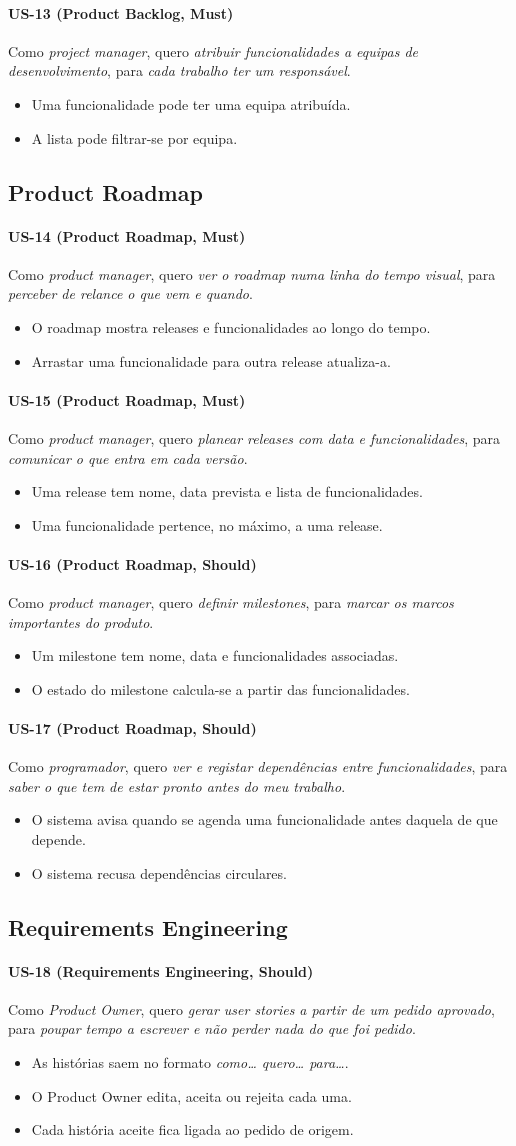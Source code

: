 \documentclass[12pt,a4paper]{article}
\newcommand{\us}[7]{%
  \paragraph{#1 \textnormal{(#2, #6)}}
  Como \textit{#3}, quero \textit{#4}, para \textit{#5}.
  \begin{itemize}
  #7
  \end{itemize}
}
\begin{document}
\us{US-13}{Product Backlog}{project manager}{atribuir funcionalidades a equipas de desenvolvimento}{cada trabalho ter um responsável}{Must}{
\item Uma funcionalidade pode ter uma equipa atribuída.
\item A lista pode filtrar-se por equipa.}

\subsection{Product Roadmap}

\us{US-14}{Product Roadmap}{product manager}{ver o roadmap numa linha do tempo visual}{perceber de relance o que vem e quando}{Must}{
\item O roadmap mostra releases e funcionalidades ao longo do tempo.
\item Arrastar uma funcionalidade para outra release atualiza-a.}

\us{US-15}{Product Roadmap}{product manager}{planear releases com data e funcionalidades}{comunicar o que entra em cada versão}{Must}{
\item Uma release tem nome, data prevista e lista de funcionalidades.
\item Uma funcionalidade pertence, no máximo, a uma release.}

\us{US-16}{Product Roadmap}{product manager}{definir milestones}{marcar os marcos importantes do produto}{Should}{
\item Um milestone tem nome, data e funcionalidades associadas.
\item O estado do milestone calcula-se a partir das funcionalidades.}

\us{US-17}{Product Roadmap}{programador}{ver e registar dependências entre funcionalidades}{saber o que tem de estar pronto antes do meu trabalho}{Should}{
\item O sistema avisa quando se agenda uma funcionalidade antes daquela de que depende.
\item O sistema recusa dependências circulares.}

\subsection{Requirements Engineering}

\us{US-18}{Requirements Engineering}{Product Owner}{gerar user stories a partir de um pedido aprovado}{poupar tempo a escrever e não perder nada do que foi pedido}{Should}{
\item As histórias saem no formato \textit{como\ldots{} quero\ldots{} para\ldots}.
\item O Product Owner edita, aceita ou rejeita cada uma.
\item Cada história aceite fica ligada ao pedido de origem.}
\end{document}
